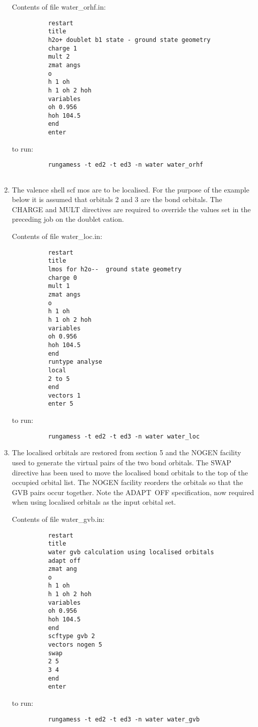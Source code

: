 \documentclass[11pt,fleqn]{article}
\begin{document}
\begin{enumerate}
Contents of file water\_orhf.in:
{
\footnotesize
\begin{verbatim}
          restart
          title
          h2o+ doublet b1 state - ground state geometry
          charge 1
          mult 2
          zmat angs
          o
          h 1 oh
          h 1 oh 2 hoh
          variables
          oh 0.956
          hoh 104.5
          end
          enter
\end{verbatim}
}
to run:
{
\footnotesize
\begin{verbatim}
          rungamess -t ed2 -t ed3 -n water water_orhf
 
\end{verbatim}
}
\item The valence shell scf mos are to be localised. For the purpose
of the example below it is assumed that orbitals 2 and 3 are the bond
orbitals.  The CHARGE and MULT directives are required to override the
values set in the preceding job on the doublet cation.

Contents of file water\_loc.in:
{
\footnotesize
\begin{verbatim}
          restart
          title
          lmos for h2o--  ground state geometry
          charge 0
          mult 1
          zmat angs
          o
          h 1 oh
          h 1 oh 2 hoh
          variables
          oh 0.956
          hoh 104.5
          end
          runtype analyse
          local
          2 to 5
          end
          vectors 1
          enter 5
\end{verbatim}
}
to run:
{
\footnotesize
\begin{verbatim}
          rungamess -t ed2 -t ed3 -n water water_loc
\end{verbatim}
}
\item The localised orbitals are restored from section 5 and the NOGEN
facility used to generate the virtual pairs of the two bond orbitals. The
SWAP directive has been used to move the localised bond orbitals to the
top of the occupied orbital list. The NOGEN facility reorders the orbitals
so that the GVB pairs occur together.  Note the ADAPT~OFF specification,
now required when using localised orbitals as the input orbital set.

Contents of file water\_gvb.in:
{
\footnotesize
\begin{verbatim}
          restart
          title
          water gvb calculation using localised orbitals
          adapt off
          zmat ang
          o
          h 1 oh
          h 1 oh 2 hoh
          variables
          oh 0.956
          hoh 104.5
          end
          scftype gvb 2
          vectors nogen 5
          swap
          2 5
          3 4
          end
          enter
\end{verbatim}
}
to run:
{
\footnotesize
\begin{verbatim}
          rungamess -t ed2 -t ed3 -n water water_gvb
\end{verbatim}
}
\end{enumerate}
\end{document}
